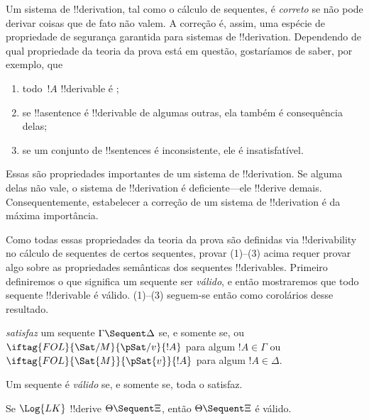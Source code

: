 \documentclass[../../../include/open-logic-section]{subfiles}
\begin{document}
      {}
      {}


\begin{explain}
Um sistema de !!{derivation}, tal como o cálculo de sequentes, é
\emph{correto} se não pode derivar coisas que de fato não valem.  A
correção é, assim, uma espécie de propriedade de segurança garantida
para sistemas de !!{derivation}.  Dependendo de qual propriedade da
teoria da prova está em questão, gostaríamos de saber, por exemplo, que
\begin{enumerate}
\item todo~$!A$ !!{derivable} é ;
\item se !!a{sentence} é !!{derivable} de algumas outras, ela também é
  consequência delas;
\item se um conjunto de !!{sentence}s é inconsistente, ele é insatisfatível.
\end{enumerate}
Essas são propriedades importantes de um sistema de !!{derivation}.  Se
alguma delas não vale, o sistema de !!{derivation} é deficiente---ele
!!{derive} demais.  Consequentemente, estabelecer a correção de um
sistema de !!{derivation} é da máxima importância.

Como todas essas propriedades da teoria da prova são definidas via
!!{derivability} no cálculo de sequentes de certos sequentes, provar
(1)--(3) acima requer provar algo sobre as propriedades semânticas dos
sequentes !!{derivable}s.  Primeiro definiremos o que significa um
sequente ser \emph{válido}, e então mostraremos que todo sequente
!!{derivable} é válido.  (1)--(3) seguem-se então como corolários
desse resultado.
\end{explain}

\begin{defn}
 \emph{satisfaz} um sequente
$\Gamma \Sequent \Delta$ se, e somente se, ou
$\iftag{FOL}{\Sat/{M}}{\pSat/{v}}{!A}$ para algum $!A \in \Gamma$ ou
$\iftag{FOL}{\Sat{M}}{\pSat{v}}{!A}$ para algum $!A \in \Delta$.

Um sequente é \emph{válido} se, e somente se, toda  o satisfaz.
\end{defn}

\begin{thm}[Correção]
 Se $\Log{LK}$ !!{derive} $\Theta
\Sequent \Xi$, então $\Theta \Sequent \Xi$ é válido.
\end{thm}
\end{document}
